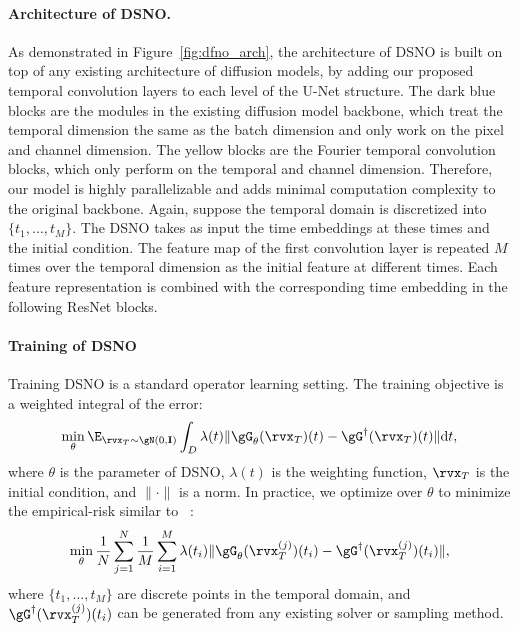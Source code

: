 \vspace{-0.1in}
\paragraph{Architecture of DSNO.}
As demonstrated in Figure~\ref{fig:dfno_arch}, the architecture of DSNO is built on top of any existing architecture of diffusion models, by adding our proposed temporal convolution layers to each level of the U-Net structure. The dark blue blocks are the modules in the existing diffusion model backbone, which treat the temporal dimension the same as the batch dimension and only work on the pixel and channel dimension. The yellow blocks are the Fourier temporal convolution blocks, which only perform on the temporal and channel dimension. Therefore, our model is highly parallelizable and adds minimal computation complexity to the original backbone. Again, suppose the temporal domain is discretized into $\{t_1, \dots, t_M\}$. The DSNO takes as input the time embeddings at these times and the initial condition. The feature map of the first convolution layer is repeated $M$ times over the temporal dimension as the initial feature at different times.
Each feature representation is combined with the corresponding time embedding in the following ResNet blocks. 

\vspace{-0.1in}
\paragraph{Training of DSNO}
Training DSNO is a standard operator learning setting. The training objective is a weighted integral of the error: 
\begin{equation}
    \min_{\theta} \E_{\rvx_T\sim \gN(0, \mathbf{I})} \int_D \lambda(t)\|\gG_{\theta}(\rvx_T)(t) - \gG^{\dagger}(\rvx_T)(t)\| \df t, 
\end{equation}
where $\theta$ is the parameter of DSNO, $\lambda(t)$ is the weighting function, $\rvx_{T}$ is the initial condition, and $\|\cdot\|$ is a norm. In practice, we optimize over $\theta$ to minimize the empirical-risk similar to ~\citet{kovachki2021neural}:
\begin{equation}
    \min_{\theta} \frac{1}{N}\sum_{j=1}^{N}\frac{1}{M}\sum_{i=1}^{M} \lambda(t_i)\|\gG_{\theta}(\rvx_T^{(j)})(t_i) - \gG^{\dagger}(\rvx_T^{(j)})(t_i)\|,
\end{equation}
where $\{t_1,\dots, t_M\}$ are discrete points in the temporal domain, and $\gG^{\dagger}(\rvx_T^{(j)})(t_i)$ can be generated from any existing solver or sampling method. 
\vspace{-0.1in}
